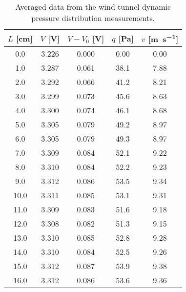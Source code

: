 \begin{table}[htpb]
    \caption{Averaged data from the wind tunnel dynamic pressure distribution measurements.}
    \label{tab:wind_tunnel_data}
    \centering
    \begin{tabular}{ccccc}
        \toprule
        $L$ [\unit{\centi\meter}] & $V$ [\unit{\volt}] & $V - V_0$ [\unit{\volt}] & $q$ [\unit{\pascal}] & $v$ [\unit{\meter\per\second}] \\
        \midrule
        \num{0.0} & \num{3.226} & \num{0.000} & \num{0.00} & \num{0.00} \\
        \num{1.0} & \num{3.287} & \num{0.061} & \num{38.1} & \num{7.88} \\
        \num{2.0} & \num{3.292} & \num{0.066} & \num{41.2} & \num{8.21} \\
        \num{3.0} & \num{3.299} & \num{0.073} & \num{45.6} & \num{8.63} \\
        \num{4.0} & \num{3.300} & \num{0.074} & \num{46.1} & \num{8.68} \\
        \num{5.0} & \num{3.305} & \num{0.079} & \num{49.2} & \num{8.97} \\
        \num{6.0} & \num{3.305} & \num{0.079} & \num{49.3} & \num{8.97} \\
        \num{7.0} & \num{3.309} & \num{0.084} & \num{52.1} & \num{9.22} \\
        \num{8.0} & \num{3.310} & \num{0.084} & \num{52.2} & \num{9.23} \\
        \num{9.0} & \num{3.312} & \num{0.086} & \num{53.5} & \num{9.34} \\
        \num{10.0} & \num{3.311} & \num{0.085} & \num{53.1} & \num{9.31} \\
        \num{11.0} & \num{3.309} & \num{0.083} & \num{51.6} & \num{9.18} \\
        \num{12.0} & \num{3.308} & \num{0.082} & \num{51.3} & \num{9.15} \\
        \num{13.0} & \num{3.310} & \num{0.085} & \num{52.8} & \num{9.28} \\
        \num{14.0} & \num{3.310} & \num{0.084} & \num{52.5} & \num{9.26} \\
        \num{15.0} & \num{3.312} & \num{0.087} & \num{53.9} & \num{9.38} \\
        \num{16.0} & \num{3.312} & \num{0.086} & \num{53.6} & \num{9.36} \\
        \bottomrule
    \end{tabular}
\end{table}
